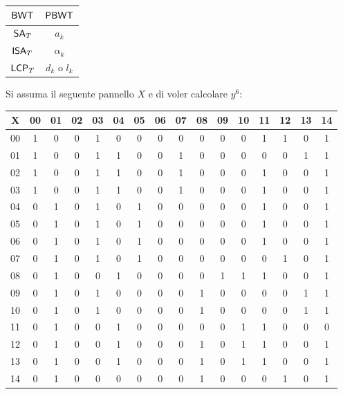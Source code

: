 \begin{table}[H]
  \centering
  \begin{tabular}{c|c}
    $\mbox{\rm {\sf BWT}}$ & $\mbox{\rm {\sf PBWT}}$\\
    \hline
    $\mbox{\rm {\sf SA}}_T$ & $a_k$\\
    $\mbox{\rm {\sf ISA}}_T$ & $\alpha_k$\\
    $\mbox{\rm {\sf LCP}}_T$ & $d_k$ o $l_k$\\            
  \end{tabular}
\end{table}
\newpage
\begin{esempio}
  \label{es:pbwt1}
  Si assuma il seguente pannello $X$ e di voler calcolare $y^6$:
  \begin{table}[H]
    \centering
    \scriptsize
    \begin{tabular}{c|ccccccccccccccc}
      X & 00 & 01 & 02 & 03 & 04 & 05 & 06 & 07 & 08 & 09 & 10 & 11 & 12 & 13
      & 14 \\
      \hline
      00 & 1 & 0 & 0 & 1 & 0 & 0 & 0 & 0 & 0 & 0 & 0 & 1 & 1 & 0 & 1 \\
      01 & 1 & 0 & 0 & 1 & 1 & 0 & 0 & 1 & 0 & 0 & 0 & 0 & 0 & 1 & 1 \\
      02 & 1 & 0 & 0 & 1 & 1 & 0 & 0 & 1 & 0 & 0 & 0 & 1 & 0 & 0 & 1 \\
      03 & 1 & 0 & 0 & 1 & 1 & 0 & 0 & 1 & 0 & 0 & 0 & 1 & 0 & 0 & 1 \\
      04 & 0 & 1 & 0 & 1 & 0 & 1 & 0 & 0 & 0 & 0 & 0 & 1 & 0 & 0 & 1 \\
      05 & 0 & 1 & 0 & 1 & 0 & 1 & 0 & 0 & 0 & 0 & 0 & 1 & 0 & 0 & 1 \\
      06 & 0 & 1 & 0 & 1 & 0 & 1 & 0 & 0 & 0 & 0 & 0 & 1 & 0 & 0 & 1 \\
      07 & 0 & 1 & 0 & 1 & 0 & 1 & 0 & 0 & 0 & 0 & 0 & 0 & 1 & 0 & 1 \\
      08 & 0 & 1 & 0 & 0 & 1 & 0 & 0 & 0 & 0 & 1 & 1 & 1 & 0 & 0 & 1 \\
      09 & 0 & 1 & 0 & 1 & 0 & 0 & 0 & 0 & 1 & 0 & 0 & 0 & 0 & 1 & 1 \\
      10 & 0 & 1 & 0 & 1 & 0 & 0 & 0 & 0 & 1 & 0 & 0 & 0 & 0 & 1 & 1 \\
      11 & 0 & 1 & 0 & 0 & 1 & 0 & 0 & 0 & 0 & 0 & 1 & 1 & 0 & 0 & 0 \\
      12 & 0 & 1 & 0 & 0 & 1 & 0 & 0 & 0 & 1 & 0 & 1 & 1 & 0 & 0 & 1 \\
      13 & 0 & 1 & 0 & 0 & 1 & 0 & 0 & 0 & 1 & 0 & 1 & 1 & 0 & 0 & 1 \\
      14 & 0 & 1 & 0 & 0 & 0 & 0 & 0 & 0 & 1 & 0 & 0 & 0 & 1 & 0 & 1 \\

\end{tabular}
\end{table}
\end{esempio}
